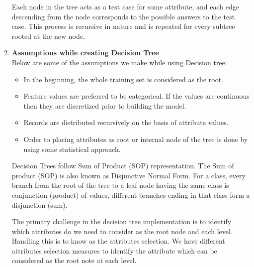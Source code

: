 \begin{enumerate}
Each node in the tree acts as a test case for some attribute, and each edge descending from the node corresponds to the possible answers to the test case. This process is recursive in nature and is repeated for every subtree rooted at the new node.

\item \textbf{Assumptions while creating Decision Tree}\\
Below are some of the assumptions we make while using Decision tree:\\
\vspace{-18pt}
\begin{itemize}
\item In the beginning, the whole training set is considered as the root.
\item Feature values are preferred to be categorical. If the values are continuous then they are discretized prior to building the model.
\item Records are distributed recursively on the basis of attribute values.
\item Order to placing attributes as root or internal node of the tree is done by using some statistical approach.
\end{itemize}
Decision Trees follow Sum of Product (SOP) representation. The Sum of product (SOP) is also known as Disjunctive Normal Form. For a class, every branch from the root of the tree to a leaf node having the same class is conjunction (product) of values, different branches ending in that class form a disjunction (sum).

The primary challenge in the decision tree implementation is to identify which attributes do we need to consider as the root node and each level. Handling this is to know as the attributes selection. We have different attributes selection measures to identify the attribute which can be considered as the root note at each level.


\end{enumerate}
